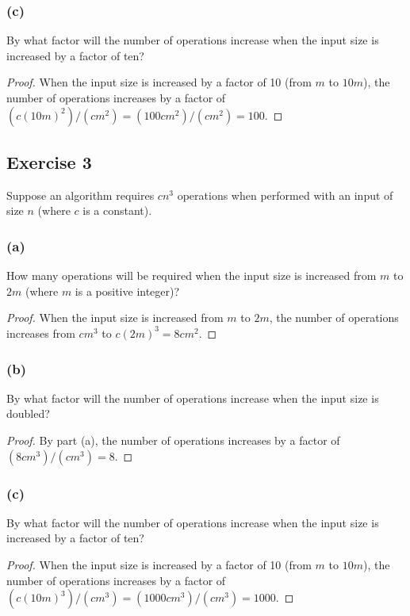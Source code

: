 \documentclass[14pt]{extarticle}
\begin{document}
\subsubsection{(c)}
By what factor will the number of operations increase when the input size is increased by a factor of ten?

\begin{proof}
    When the input size is increased by a factor of 10 (from \(m\) to \(10m\)), the number of operations increases by a factor of
    \((c(10m)^2)/(cm^2) = (100cm^2)/(cm^2) = 100\).
\end{proof}

\subsection{Exercise 3}
Suppose an algorithm requires \(cn^3\) operations when performed with an input of size \(n\) (where \(c\) is a
constant).

\subsubsection{(a)}
How many operations will be required when the input size is increased from \(m\) to \(2m\) (where \(m\) is a positive
integer)?

\begin{proof}
    When the input size is increased from \(m\) to \(2m\), the number of operations increases from \(cm^3\) to
    \(c(2m)^3 = 8cm^2\).
\end{proof}

\subsubsection{(b)}
By what factor will the number of operations increase when the input size is doubled?

\begin{proof}
    By part (a), the number of operations increases by a factor of \((8cm^3)/(cm^3) = 8\).
\end{proof}

\subsubsection{(c)}
By what factor will the number of operations increase when the input size is increased by a factor of ten?

\begin{proof}
    When the input size is increased by a factor of 10 (from \(m\) to \(10m\)), the number of operations increases by a factor of
    \((c(10m)^3)/(cm^3) = (1000cm^3)/(cm^3) = 1000\).
\end{proof}
\end{document}
